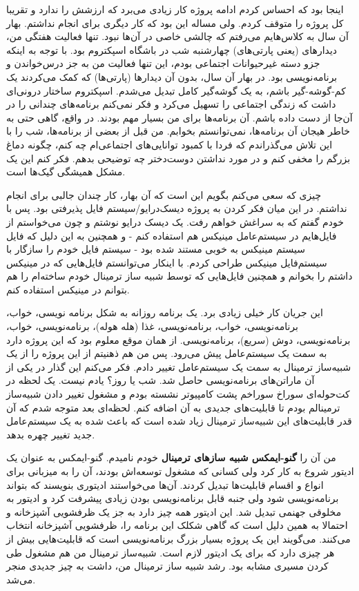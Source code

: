 اینجا بود که احساس کردم ادامه پروژه کار زیادی می‌برد که ارزشش را ندارد
و تقریبا کل پروژه را متوقف کردم. ولی مساله این بود که کار دیگری برای
انجام نداشتم. بهار آن‌ سال به کلاس‌هایم می‌رفتم که چالشی خاصی در آن‌ها
نبود. تنها فعالیت هفتگی من، دیدارهای (یعنی پارتی‌های) چهارشنبه شب در
باشگاه اسپکتروم بود. با توجه به اینکه جزو دسته غیرحیوانات
اجتماعی بودم، این تنها فعالیت من به جز
درس‌خواندن و برنامه‌نویسی بود. در بهار آن سال، بدون آن دیدارها (پارتی‌ها)
که کمک می‌کردند یک کم-گوشه‌-گیر باشم، به یک گوشه‌گیر کامل تبدیل
می‌شدم. اسپکتروم ساختار درونی‌ای داشت که زندگی اجتماعی را تسهیل می‌کرد و
فکر نمی‌کنم برنامه‌های چندانی را در آن‌جا از دست داده باشم. آن برنامه‌ها
برای من بسیار مهم بودند. در واقع، گاهی حتی به خاطر هیجان آن برنامه‌ها،
نمی‌توانستم بخوابم. من قبل از بعضی‌ از برنامه‌ها، شب را با این تلاش
می‌گذراندم که فردا با کمبود توانایی‌های اجتماعی‌ام چه کنم، چگونه دماغ
بزرگم را مخفی کنم و در مورد نداشتن دوست‌دختر چه توضیحی بدهم. فکر کنم
این یک مشکل همیشگی گیک‌ها است.

چیزی که سعی‌ می‌کنم بگویم این است که آن بهار، کار چندان جالبی برای انجام
نداشتم. در این میان فکر کردن به پروژه دیسک‌درایو/سیستم فایل پذیرفتی
بود. پس با خودم گفتم که به سراغش خواهم رفت. یک دیسک درایو نوشتم و چون
می‌خواستم از فایل‌هایم در سیستم‌عامل مینیکس هم استفاده کنم - و همچنین به
این دلیل که فایل سیستم مینیکس به خوبی مستند شده بود - سیستم‌ فایل خودم
را سازگار با سیستم‌فایل مینیکس طراحی کردم. با اینکار می‌توانستم فایل‌هایی
که در مینیکس داشتم را بخوانم و همچنین فایل‌هایی که توسط شبیه ساز
ترمینال خودم ساخته‌ام را هم بتوانم در مینیکس استفاده کنم.

این جریان کار خیلی زیادی برد. یک برنامه روزانه به شکل برنامه نویسی،
خواب، برنامه‌نویسی، خواب، برنامه‌نویسی، غذا (هله هوله)، برنامه‌نویسی،
خواب، برنامه‌نویسی، دوش (سریع)، برنامه‌نویسی. از همان موقع معلوم بود که
این پروژه دارد به سمت یک سیستم‌عامل پیش‌ می‌رود. پس من هم ذهنیتم از این
پروژه را از یک شبیه‌ساز ترمینال به سمت یک سیستم‌عامل تغییر دادم. فکر
می‌کنم این گذار در یکی از آن ماراتن‌های برنامه‌نویسی حاصل شد. شب یا روز؟
یادم نیست. یک لحظه در کت‌حوله‌ای سوراخ سوراخم پشت کامپیوتر نشسته بودم و
مشغول تغییر دادن شبیه‌ساز ترمینالم بودم تا قابلیت‌های جدیدی به آن اضافه
کنم. لحظه‌ای بعد متوجه شدم که آن قدر قابلیت‌های این شبیه‌ساز ترمینال زیاد
شده است که باعث شده به یک سیستم‌عامل جدید تغییر چهره بدهد.

من آن را \textbf{گنو-ایمکس شبیه سازهای ترمینال} خودم نامیدم. گنو-ایمکس به عنوان یک
ادیتور شروع به کار کرد ولی کسانی که مشغول توسعه‌اش بودند، آن را به
میزبانی برای انواع و اقسام قابلیت‌ها تبدیل کردند. آن‌ها می‌خواستند
ادیتوری بنویسند که بتواند برنامه‌نویسی شود ولی جنبه قابل برنامه‌نویسی
بودن زیادی پیشرفت کرد و ادیتور به مخلوقی جهنمی تبدیل شد. این ادیتور
همه چیز دارد به جز یک ظرفشویی آشپزخانه و احتمالا به همین دلیل است که
گاهی شکلک این برنامه را، ظرفشویی آشپزخانه انتخاب می‌کنند. می‌گویند این
یک پروژه بسیار بزرگ برنامه‌نویسی است که قابلیت‌هایی بیش از هر چیزی دارد
که برای یک ادیتور لازم است. شبیه‌ساز ترمینال من هم مشغول طی کردن مسیری
مشابه بود. رشد شبیه ساز ترمینال من، داشت به چیز جدیدی منجر می‌شد.



